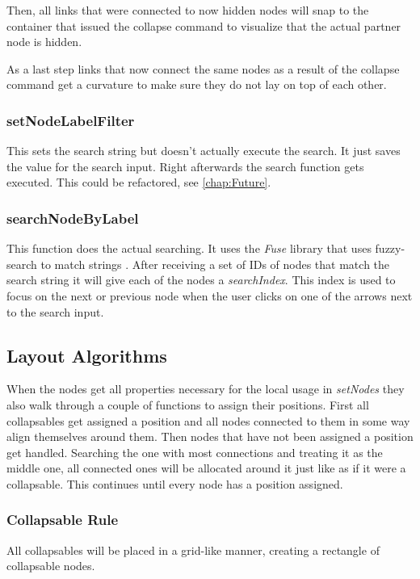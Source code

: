 Then, all links that were connected to now hidden nodes will snap to the container that issued the collapse command to visualize that the actual partner node is hidden.

As a last step links that now connect the same nodes as a result of the collapse command get a curvature to make sure they do not lay on top of each other.

\subsubsection{setNodeLabelFilter}
This sets the search string but doesn't actually execute the search. It just saves the value for the search input. Right afterwards the search function gets executed. This could be refactored, see \autoref{chap:Future}.

\subsubsection{searchNodeByLabel}
This function does the actual searching. It uses the \emph{Fuse} library that uses fuzzy-search to match strings \cite{Fuze}. After receiving a set of IDs of nodes that match the search string it will give each of the nodes a \emph{searchIndex}. This index is used to focus on the next or previous node when the user clicks on one of the arrows next to the search input.


\subsection{Layout Algorithms}
When the nodes get all properties necessary for the local usage in \emph{setNodes} they also walk through a couple of functions to assign their positions. First all collapsables get assigned a position and all nodes connected to them in some way align themselves around them. Then nodes that have not been assigned a position get handled. Searching the one with most connections and treating it as the middle one, all connected ones will be allocated around it just like as if it were a collapsable. This continues until every node has a position assigned.

\subsubsection{Collapsable Rule}
All collapsables will be placed in a grid-like manner, creating a rectangle of collapsable nodes.

